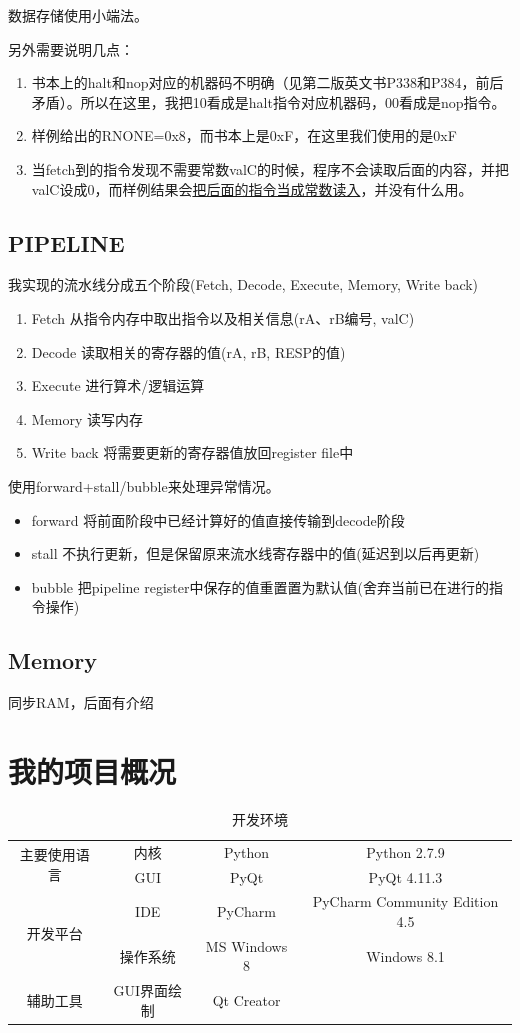 \documentclass{article}
\begin{document}
数据存储使用小端法。\cite{3}

另外需要说明几点：
\begin{enumerate}
\item 书本上的halt和nop对应的机器码不明确（见第二版英文书P338和P384，前后矛盾）。所以在这里，我把10看成是halt指令对应机器码，00看成是nop指令。
\item 样例给出的RNONE=0x8，而书本上是0xF，在这里我们使用的是0xF
\item 当fetch到的指令发现不需要常数valC的时候，程序不会读取后面的内容，并把valC设成0，而样例结果会\underline{把后面的指令当成常数读入}，并没有什么用。
\end{enumerate}
\subsection{PIPELINE}
我实现的流水线分成五个阶段(Fetch, Decode, Execute, Memory, Write back)
\begin{enumerate}
\item Fetch      从指令内存中取出指令以及相关信息(rA、rB编号, valC)
\item Decode     读取相关的寄存器的值(rA, rB, RESP的值)
\item Execute    进行算术/逻辑运算
\item Memory     读写内存
\item Write back 将需要更新的寄存器值放回register file中
\end{enumerate}

使用forward+stall/bubble来处理异常情况。
\begin{itemize}
\item forward 将前面阶段中已经计算好的值直接传输到decode阶段
\item stall 不执行更新，但是保留原来流水线寄存器中的值(延迟到以后再更新)
\item bubble 把pipeline register中保存的值重置置为默认值(舍弃当前已在进行的指令操作)
\end{itemize}
\subsection{Memory}
同步RAM，后面有介绍
\section{我的项目概况}
\begin{center}
\begin{table}[!ht]     %
\centering
\caption{开发环境}
\begin{tabular}{|c|c|c|c|}
\hline
\multirow{2}{*}{主要使用语言} & 内核 & Python & Python 2.7.9\\
\cline{2-4}
 & GUI & PyQt & PyQt 4.11.3\\
\hline
\multirow{2}{*}{开发平台} & IDE & PyCharm & PyCharm Community Edition 4.5\\
\cline{2-4}
& 操作系统 & MS Windows 8 & Windows 8.1\\
\hline
辅助工具 & GUI界面绘制 & Qt Creator &\\
\hline
\end{tabular}
\end{table}
\end{center}
\end{document}
